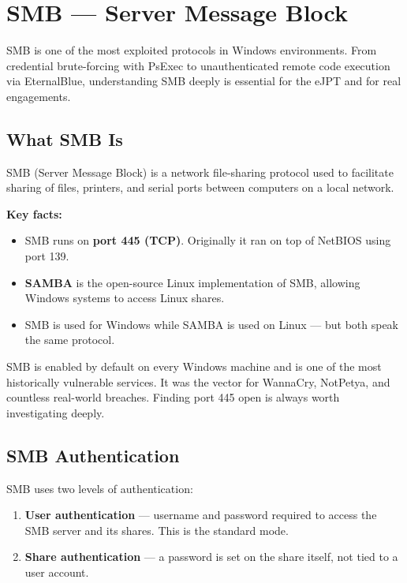 \chapter{SMB --- Server Message Block}
\label{ch:smb}

SMB is one of the most exploited protocols in Windows environments. From credential
brute-forcing with PsExec to unauthenticated remote code execution via EternalBlue,
understanding SMB deeply is essential for the eJPT and for real engagements.

\section{What SMB Is}
\label{sec:smb_theory}

SMB (Server Message Block) is a network file-sharing protocol used to facilitate
sharing of files, printers, and serial ports between computers on a local network.

\textbf{Key facts:}
\begin{itemize}
  \item SMB runs on \textbf{port 445 (TCP)}. Originally it ran on top of
        NetBIOS using port 139.
  \item \textbf{SAMBA} is the open-source Linux implementation of SMB, allowing
        Windows systems to access Linux shares.
  \item SMB is used for Windows while SAMBA is used on Linux --- but both speak
        the same protocol.
\end{itemize}

\begin{whybox}
SMB is enabled by default on every Windows machine and is one of the most
historically vulnerable services. It was the vector for WannaCry, NotPetya, and
countless real-world breaches. Finding port 445 open is always worth investigating
deeply.
\end{whybox}

\section{SMB Authentication}
\label{sec:smb_auth}

SMB uses two levels of authentication:

\begin{enumerate}
  \item \textbf{User authentication} --- username and password required to access
        the SMB server and its shares. This is the standard mode.
  \item \textbf{Share authentication} --- a password is set on the share itself,
        not tied to a user account.
\end{enumerate}

